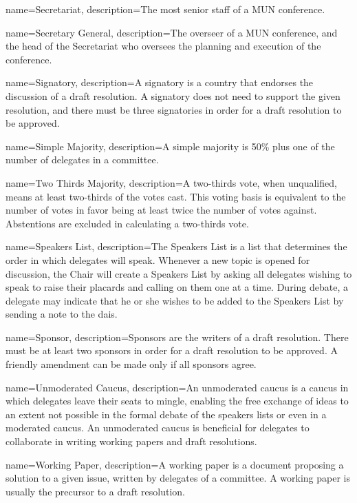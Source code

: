 {
	name={Secretariat},
	description={The most senior staff of a MUN conference.}
}

{
	name={Secretary General},
	description={The overseer of a MUN conference, and the head of the Secretariat who oversees the planning and execution of the conference.}
}

{
	name={Signatory},
	description={A signatory is a country that endorses the discussion of a draft resolution. A signatory does not need to support the given resolution, and there must be three signatories in order for a draft resolution to be approved.}
}

{
	name={Simple Majority},
	description={A simple majority is 50\% plus one of the number of delegates in a committee.}
}

{
	name={Two Thirds Majority},
	description={A two-thirds vote, when unqualified, means at least two-thirds of the votes cast. This voting basis is equivalent to the number of votes in favor being at least twice the number of votes against. Abstentions are excluded in calculating a two-thirds vote.}
}

{
	name={Speakers List},
	description={The Speakers List is a list that determines the order in which delegates will speak. Whenever a new topic is opened for discussion, the Chair will create a Speakers List by asking all delegates wishing to speak to raise their placards and calling on them one at a time. During debate, a delegate may indicate that he or she wishes to be added to the Speakers List by sending a note to the dais.}
}

{
	name={Sponsor},
	description={Sponsors are the writers of a draft resolution. There must be at least two sponsors in order for a draft resolution to be approved. A friendly amendment can be made only if all sponsors agree.}
}

{
	name={Unmoderated Caucus},
	description={An unmoderated caucus is a caucus in which delegates leave their seats to mingle, enabling the free exchange of ideas to an extent not possible in the formal debate of the speakers lists or even in a moderated caucus. An unmoderated caucus is beneficial for delegates to collaborate in writing working papers and draft resolutions.}
}

{
	name={Working Paper},
	description={A working paper is a document proposing a solution to a given issue, written by delegates of a committee. A working paper is usually the precursor to a draft resolution.}
}

